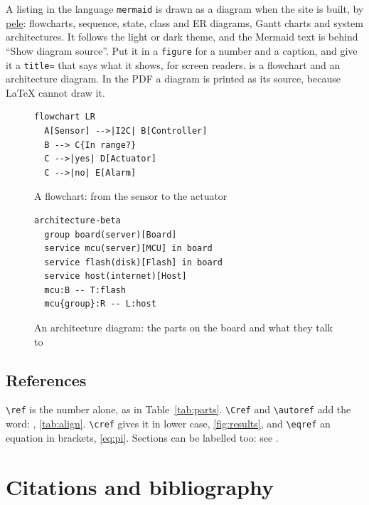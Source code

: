 A listing in the language \texttt{mermaid} is drawn as a diagram when the site is built, by \href{https://pele.run}{pele}: flowcharts, sequence, state, class and ER diagrams, Gantt charts and system architectures. It follows the light or dark theme, and the Mermaid text is behind ``Show diagram source''. Put it in a \texttt{figure} for a number and a caption, and give it a \texttt{title=} that says what it shows, for screen readers.  is a flowchart and  an architecture diagram. In the PDF a diagram is printed as its source, because LaTeX cannot draw it.

\begin{figure}
\begin{lstlisting}[language=mermaid, title={Signal path of the controller}]
flowchart LR
  A[Sensor] -->|I2C| B[Controller]
  B --> C{In range?}
  C -->|yes| D[Actuator]
  C -->|no| E[Alarm]
\end{lstlisting}
\caption{A flowchart: from the sensor to the actuator}
\label{fig:flow}
\end{figure}

\begin{figure}
\begin{lstlisting}[language=mermaid, title={Boards and services of the system}]
architecture-beta
  group board(server)[Board]
  service mcu(server)[MCU] in board
  service flash(disk)[Flash] in board
  service host(internet)[Host]
  mcu:B -- T:flash
  mcu{group}:R -- L:host
\end{lstlisting}
\caption{An architecture diagram: the parts on the board and what they talk to}
\label{fig:arch}
\end{figure}

\subsection{References}

\texttt{\textbackslash{}ref} is the number alone, as in Table~\ref{tab:parts}. \texttt{\textbackslash{}Cref} and \texttt{\textbackslash{}autoref} add the word: , \autoref{tab:align}. \texttt{\textbackslash{}cref} gives it in lower case, \cref{fig:results}, and \texttt{\textbackslash{}eqref} an equation in brackets, \eqref{eq:pi}. Sections can be labelled too: see .

\clearpage

\section{Citations and bibliography}
\label{sec:cite}

